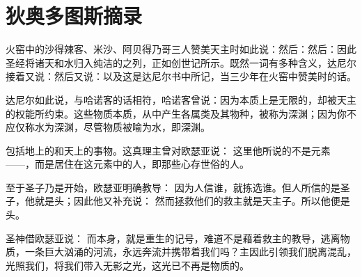 
\chapter{狄奥多图斯摘录}


\par

火窑中的沙得辣客、米沙、阿贝得乃哥三人赞美天主时如此说：然后：然后：因此圣经将诸天和水归入纯洁的之列，正如创世记所示。既然一词有多种含义，达尼尔接着又说：然后又说：以及这是达尼尔书中所记，当三少年在火窑中赞美时的话。\par

达尼尔如此说，与哈诺客的话相符，哈诺客曾说：因为本质上是无限的，却被天主的权能所约束。这些物质本质，从中产生各属类及其物种，被称为深渊；因为你不应仅称水为深渊，尽管物质被喻为水，即深渊。\par

  包括地上的和天上的事物。这真理主曾对欧瑟亚说：  这里他所说的不是元素——，而是居住在这元素中的人，即那些心存世俗的人。\par

至于圣子乃是开始，欧瑟亚明确教导：  因为人信谁，就拣选谁。但人所信的是圣子，他就是头；因此他又补充说：  然而拯救他们的救主就是天主子。所以他便是头。\par

圣神借欧瑟亚说：    而本身，就是重生的记号，难道不是藉着救主的教导，逃离物质，一条巨大汹涌的河流，永远奔流并携带着我们吗？主因此引领我们脱离混乱，光照我们，将我们带入无影之光，这光已不再是物质的。\par

